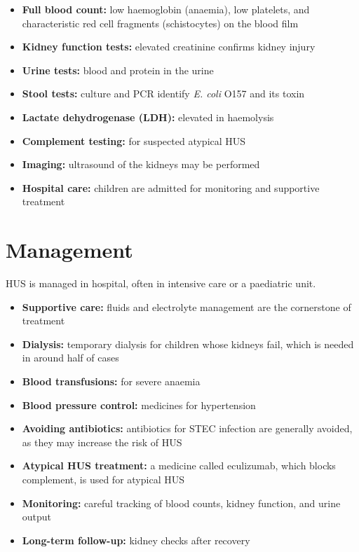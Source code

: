 \begin{itemize}
    \item \textbf{Full blood count:} low haemoglobin (anaemia), low platelets, and characteristic red cell fragments (schistocytes) on the blood film
    \item \textbf{Kidney function tests:} elevated creatinine confirms kidney injury
    \item \textbf{Urine tests:} blood and protein in the urine
    \item \textbf{Stool tests:} culture and PCR identify \textit{E. coli} O157 and its toxin
    \item \textbf{Lactate dehydrogenase (LDH):} elevated in haemolysis
    \item \textbf{Complement testing:} for suspected atypical HUS
    \item \textbf{Imaging:} ultrasound of the kidneys may be performed
    \item \textbf{Hospital care:} children are admitted for monitoring and supportive treatment
\end{itemize}

\section*{Management}
HUS is managed in hospital, often in intensive care or a paediatric unit.

\begin{itemize}
    \item \textbf{Supportive care:} fluids and electrolyte management are the cornerstone of treatment
    \item \textbf{Dialysis:} temporary dialysis for children whose kidneys fail, which is needed in around half of cases
    \item \textbf{Blood transfusions:} for severe anaemia
    \item \textbf{Blood pressure control:} medicines for hypertension
    \item \textbf{Avoiding antibiotics:} antibiotics for STEC infection are generally avoided, as they may increase the risk of HUS
    \item \textbf{Atypical HUS treatment:} a medicine called eculizumab, which blocks complement, is used for atypical HUS
    \item \textbf{Monitoring:} careful tracking of blood counts, kidney function, and urine output
    \item \textbf{Long-term follow-up:} kidney checks after recovery
\end{itemize}

